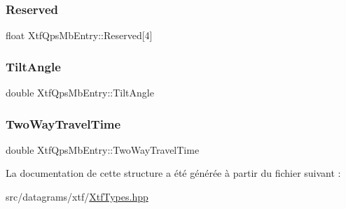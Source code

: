 \subsubsection{\texorpdfstring{Reserved}{Reserved}}
{\footnotesize\ttfamily float Xtf\+Qps\+Mb\+Entry\+::\+Reserved\mbox{[}4\mbox{]}}

\mbox{\label{structXtfQpsMbEntry_ab6d0bf444edd6e75200008415a00120c}} 
\subsubsection{\texorpdfstring{Tilt\+Angle}{TiltAngle}}
{\footnotesize\ttfamily double Xtf\+Qps\+Mb\+Entry\+::\+Tilt\+Angle}

\mbox{\label{structXtfQpsMbEntry_afdb87508cd60aab93f94ff5bebce8ae8}} 
\subsubsection{\texorpdfstring{Two\+Way\+Travel\+Time}{TwoWayTravelTime}}
{\footnotesize\ttfamily double Xtf\+Qps\+Mb\+Entry\+::\+Two\+Way\+Travel\+Time}



La documentation de cette structure a été générée à partir du fichier suivant \+:\begin{DoxyCompactItemize}
\item 
src/datagrams/xtf/\hyperlink{XtfTypes_8hpp}{Xtf\+Types.\+hpp}\end{DoxyCompactItemize}
